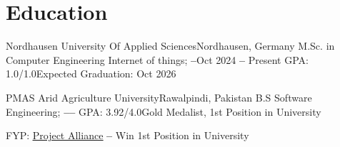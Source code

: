 


\section{Education}
\vspace{3pt}
\resumeSubHeadingListStart

\resumeEducationHeading
{Nordhausen University Of Applied Sciences}{Nordhausen, Germany}
{M.Sc. in Computer Engineering Internet of things;   \textbf{--}}{Oct 2024 \textbf{--} Present}
{GPA: 1.0/1.0}{Expected Graduation: Oct 2026}

\resumeEducationHeading
{PMAS Arid Agriculture University}{Rawalpindi, Pakistan}
{B.S Software Engineering;   \textbf{--}}{\textbf{--}}
{GPA: 3.92/4.0}{Gold Medalist, 1st Position in University}


{FYP: \href{https://github.com/Project-Alliance}{\color{blue}\underline{Project Alliance}} } \textbf{--} {Win 1st Position in University}





\resumeSubHeadingListEnd